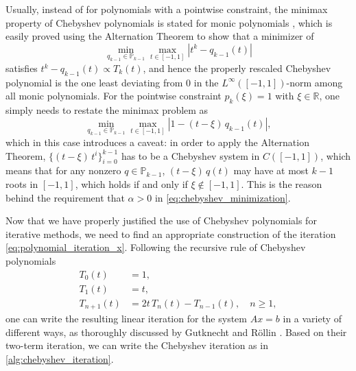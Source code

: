 \documentclass[a4paper]{article}
\theoremstyle{plain}
\theoremstyle{definition}
\theoremstyle{remark}
\begin{document}
Usually, instead of for polynomials with a pointwise constraint, the minimax property of Chebyshev polynomials is stated for monic polynomials \cite{Mason2002, Mason2005}, which is easily proved using the Alternation Theorem to show that a minimizer of
\begin{equation*}
	\min_{q_{k-1} \in \mathbb{P}_{k-1}} \max_{t\in [-1, 1]} |t^k - q_{k-1}(t)|
\end{equation*}
satisfies \(t^k - q_{k-1}(t) \propto T_k(t)\), and hence the properly rescaled Chebyshev polynomial is the one least deviating from 0 in the \(L^{\infty}([-1,1])\)-norm among all monic polynomials. For the pointwise constraint \(p_k(\xi) = 1\) with \(\xi\in\mathbb{R}\), one simply needs to restate the minimax problem as
\begin{equation*}
	\min_{q_{k-1} \in \mathbb{P}_{k-1}} \max_{t\in [-1, 1]} |1 - (t - \xi)\, q_{k-1}(t)|,
\end{equation*}
which in this case introduces a caveat: in order to apply the Alternation Theorem, \(\{(t - \xi)\, t^i\}_{i=0}^{k-1}\) has to be a Chebyshev system in \(C([-1,1])\), which means that for any nonzero \(q \in \mathbb{P}_{k-1}\), \((t - \xi)\, q(t)\) may have at most \(k-1\) roots in \([-1, 1]\), which holds if and only if \(\xi \notin [-1, 1]\). This is the reason behind the requirement that \(\alpha > 0\) in \eqref{eq:chebyshev_minimization}.

Now that we have properly justified the use of Chebyshev polynomials for iterative methods, we need to find an appropriate construction of the iteration \eqref{eq:polynomial_iteration_x}. Following the recursive rule of Chebyshev polynomials
\begin{align*}
	T_0(t) &= 1,\\
	T_1(t) &= t,\\
	T_{n+1}(t) &= 2t\, T_n(t) - T_{n-1}(t), \quad n \geq 1,
\end{align*}
one can write the resulting linear iteration for the system \(Ax = b\) in a variety of different ways, as thoroughly discussed by Gutknecht and Röllin \cite{Gutknecht2002}. Based on their two-term iteration, we can write the Chebyshev iteration as in \cref{alg:chebyshev_iteration}.
\end{document}
